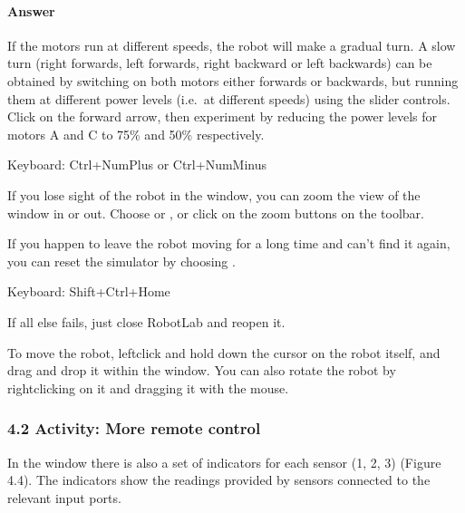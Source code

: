 \documentclass[letterpaper,10pt,english]{sphinxmanual}
\begin{document}
\paragraph{Answer}
\label{\detokenize{content/00_SOFTWARE_GUIDE/Section_00_04_LEGACY_UNUSED_IGNORE:id2}}
If the motors run at different speeds, the robot will make a gradual turn. A slow turn (right forwards, left forwards, right backward or left backwards) can be obtained by switching on both motors either forwards or backwards, but running them at different power levels (i.e. at different speeds) using the slider controls. Click on the forward arrow, then experiment by reducing the power levels for motors A and C to 75\% and 50\% respectively.





Keyboard: Ctrl+NumPlus or Ctrl+NumMinus





If you lose sight of the robot in the  window, you can zoom the view of the  window in or out. Choose  or , or click on the zoom  buttons on the toolbar.

If you happen to leave the robot moving for a long time and can’t find it again, you can reset the simulator by choosing .





Keyboard: Shift+Ctrl+Home





If all else fails, just close RobotLab and reopen it.

To move the robot, left\sphinxhyphen{}click and hold down the cursor on the robot itself, and drag and drop it within the  window. You can also rotate the robot by right\sphinxhyphen{}clicking on it and dragging it with the mouse.


\subsubsection{4.2 Activity: More remote control}
\label{\detokenize{content/00_SOFTWARE_GUIDE/Section_00_04_LEGACY_UNUSED_IGNORE:4.2-Activity:-More-remote-control}}
In the  window there is also a set of indicators for each sensor (1, 2, 3) (Figure 4.4). The indicators show the readings provided by sensors connected to the relevant input ports.
\end{document}
